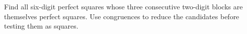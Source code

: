 Find all six-digit perfect squares whose three consecutive two-digit blocks are themselves perfect squares. Use congruences to reduce the candidates before testing them as squares.
